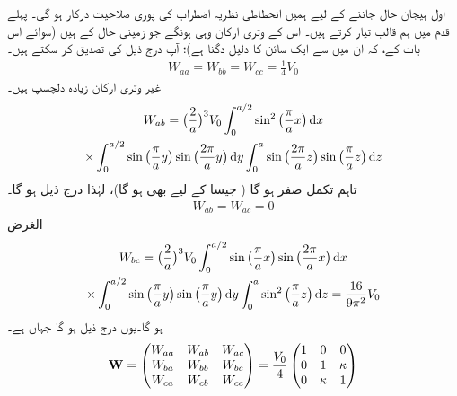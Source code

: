  اول ہیجان حال جاننے کے لیے ہمیں انحطاطی نظریہ اضطراب کی پوری صلاحیت درکار ہو گی۔ پہلے قدم میں ہم قالب  تیار کرتے ہیں۔ اس کے وتری ارکان وہی ہونگے جو زمینی حال کے ہیں (سوائے اس بات کے، کہ ان میں سے ایک سائن کا دلیل دگنا ہے)؛ آپ درج ذیل کی تصدیق کر سکتے ہیں۔
\begin{align*}
W_{aa} = W_{bb} = W_{cc} = \frac{1}{4} V_0
\end{align*}
غیر وتری ارکان زیادہ دلچسپ ہیں۔ 
\begin{multline*}
W_{ab} = \big ( \frac{2}{a} \big )^3 V_0 \int_0^{a/2} \sin^2 \big ( \frac{\pi}{a} x \big ) \dif x\\
\times \int_0^{a/2} \sin \big (\frac{\pi}{a} y \big ) \sin \big ( \frac{2 \pi}{a} y \big ) \dif y \int_0^a \sin \big ( \frac{2 \pi}{a} z \big ) \sin \big ( \frac{\pi}{a} z \big ) \dif z
\end{multline*}
تاہم  تکمل صفر ہو گا ( جیسا  کے لیے بھی ہو گا)، لہٰذا درج ذیل ہو گا۔ 
\begin{align*}
W_{ab} = W_{ac} = 0
\end{align*}
الغرض 
\begin{multline*}
W_{bc} = \big ( \frac{2}{a} \big )^3 V_0 \int_0^{a/2} \sin \big ( \frac{\pi}{a} x \big ) \sin \big (\frac{2 \pi}{a} x \big ) \dif x\\
\times \int_0^{a/2} \sin \big (\frac{\pi}{a} y \big ) \sin \big ( \frac{\pi}{a} y \big ) \dif y \int_0^a \sin^2 \big ( \frac{\pi}{a} z \big ) \dif z = \frac{16}{9 \pi^2} V_0
\end{multline*}
ہو گا۔یوں درج ذیل ہو گا جہاں  ہے۔
\begin{align}
\operatorname{\mathbf{W}} =
\begin{pmatrix}
W_{aa} & W_{ab} & W_{ac} \\
W_{ba} & W_{bb} & W_{bc} \\
W_{ca} & W_{cb} & W_{cc}
\end{pmatrix}=
 \frac{V_0}{4}
\begin{pmatrix}
1 & 0 & 0 \\
0 & 1 & \kappa \\
0 & \kappa & 1
\end{pmatrix}
\end{align}

